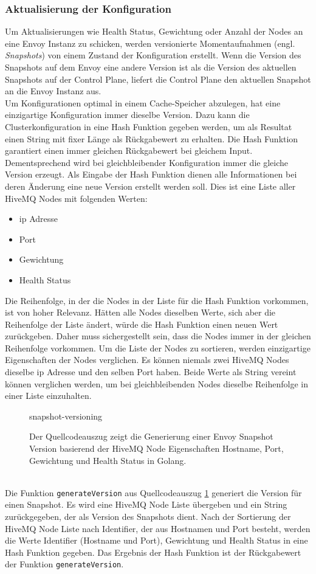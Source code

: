 \subsubsection{Aktualisierung der Konfiguration}
Um Aktualisierungen wie Health Status, Gewichtung oder Anzahl der Nodes an eine Envoy Instanz zu schicken, werden versionierte Momentaufnahmen (engl. \textit{Snapshots}) von einem Zustand der Konfiguration erstellt. Wenn die Version des Snapshots auf dem Envoy eine andere Version ist als die Version des aktuellen Snapshots auf der Control Plane, liefert die Control Plane den aktuellen Snapshot an die Envoy Instanz aus.
\\
Um Konfigurationen optimal in einem Cache-Speicher abzulegen, hat eine einzigartige Konfiguration immer dieselbe Version.
Dazu kann die Clusterkonfiguration in eine Hash Funktion gegeben werden, um als Resultat einen String mit fixer Länge als Rückgabewert zu erhalten.
Die Hash Funktion garantiert einen immer gleichen Rückgabewert bei gleichem Input. Dementsprechend wird bei gleichbleibender Konfiguration immer die gleiche Version erzeugt.
Als Eingabe der Hash Funktion dienen alle Informationen bei deren Änderung eine neue Version erstellt werden soll. Dies ist eine Liste aller HiveMQ Nodes mit folgenden Werten:
\begin{itemize}
  \item \ac{ip} Adresse
  \item Port
  \item Gewichtung
  \item Health Status
\end{itemize}
Die Reihenfolge, in der die Nodes in der Liste für die Hash Funktion vorkommen, ist von hoher Relevanz.
Hätten alle Nodes dieselben Werte, sich aber die Reihenfolge der Liste ändert, würde die Hash Funktion einen neuen Wert zurückgeben.
Daher muss sichergestellt sein, dass die Nodes immer in der gleichen Reihenfolge vorkommen.
Um die Liste der Nodes zu sortieren, werden einzigartige Eigenschaften der Nodes verglichen.
Es können niemals zwei HiveMQ Nodes dieselbe \ac{ip} Adresse und den selben Port haben. Beide Werte als String vereint können verglichen werden, um bei gleichbleibenden Nodes dieselbe Reihenfolge in einer Liste einzuhalten.
\begin{figure}
    {snapshot-versioning}
    \caption{Der Quellcodeauszug zeigt die Generierung einer Envoy Snapshot Version basierend der HiveMQ Node Eigenschaften Hostname, Port, Gewichtung und Health Status in Golang.}
    \label{code:snapshot-versioning}
\end{figure}
\\
Die Funktion \verb|generateVersion| aus Quellcodeauszug \ref{code:snapshot-versioning} generiert die Version für einen Snapshot. Es wird eine HiveMQ Node Liste übergeben und ein String zurückgegeben, der als Version des Snapshots dient. Nach der Sortierung der HiveMQ Node Liste nach Identifier, der aus Hostnamen und Port besteht, werden die Werte Identifier (Hostname und Port), Gewichtung und Health Status in eine Hash Funktion gegeben. Das Ergebnis der Hash Funktion ist der Rückgabewert der Funktion \verb|generateVersion|.

